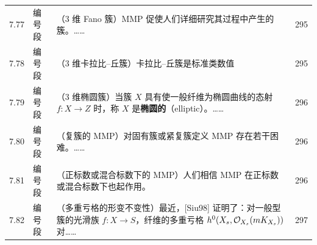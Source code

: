 \begin{longtable}{@{}p{}p{}p{}p{}@{}}
7.77 & 编号段 & （3 维 Fano 簇）\quad MMP 促使人们详细研究其过程中产生的簇。…… & 295 \\
7.78 & 编号段 & （3 维卡拉比--丘簇）\quad 卡拉比--丘簇是标准类数值 & 295 \\
7.79 & 编号段 & （3 维椭圆簇）\quad 当簇 $X$ 具有使一般纤维为椭圆曲线的态射 $f\colon X\to Z$ 时，称 $X$ 是\textbf{椭圆的}（elliptic）。…… & 296 \\
7.80 & 编号段 & （复簇的 MMP）\quad 对固有簇或紧复簇定义 MMP 存在若干困难。…… & 296 \\
7.81 & 编号段 & （正标数或混合标数下的 MMP）\quad 人们相信 MMP 在正标数或混合标数下也起作用。 & 296 \\
7.82 & 编号段 & （多重亏格的形变不变性）\quad 最近，[Siu98] 证明了：对一般型簇的光滑族 $f\colon X\to S$，纤维的多重亏格 $h^0(X_s,\mathcal{O}_{X_s}(mK_{X_s}))$ 对…… & 297 \\
\end{longtable}
\endgroup
